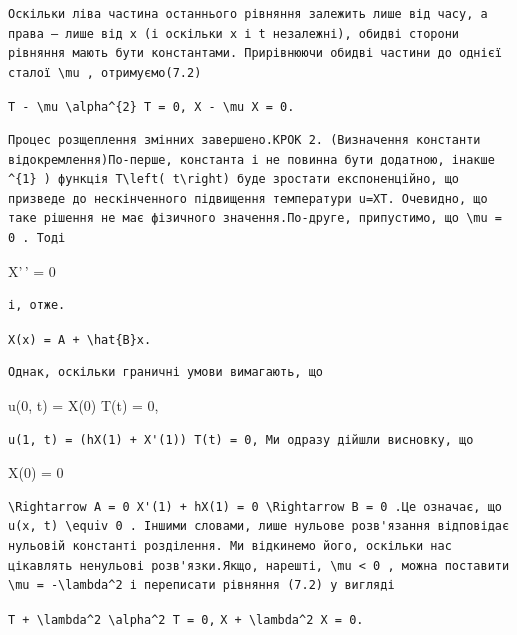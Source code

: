 \documentclass[
  ukrainian,
]{article}
\begin{document}
\begin{verbatim}
Оскільки ліва частина останнього рівняння залежить лише від часу, а права — лише від x (і оскільки x і t незалежні), обидві сторони рівняння мають бути константами. Прирівнюючи обидві частини до однієї сталої \mu , отримуємо(7.2)
\end{verbatim}

\texttt{T\textquotesingle{}\ -\ \textbackslash{}mu\ \textbackslash{}alpha\^{}\{2\}\ T\ =\ 0,\ X\textquotesingle{}\textquotesingle{}\ -\ \textbackslash{}mu\ X\ =\ 0.}

\begin{verbatim}
Процес розщеплення змінних завершено.КРОК 2. (Визначення константи відокремлення)По-перше, константа і не повинна бути додатною, інакше ^{1} ) функція T\left( t\right) буде зростати експоненційно, що призведе до нескінченного підвищення температури u=XT. Очевидно, що таке рішення не має фізичного значення.По-друге, припустимо, що \mu = 0 . Тоді
\end{verbatim}

X'\,' = 0

\begin{verbatim}
і, отже.
\end{verbatim}

\texttt{X(x)\ =\ A\ +\ \textbackslash{}hat\{B\}x.}

\begin{verbatim}
Однак, оскільки граничні умови вимагають, що
\end{verbatim}

u(0, t) = X(0) T(t) = 0,

\begin{verbatim}
u(1, t) = (hX(1) + X'(1)) T(t) = 0, Ми одразу дійшли висновку, що
\end{verbatim}

X(0) = 0

\begin{verbatim}
\Rightarrow A = 0 X'(1) + hX(1) = 0 \Rightarrow B = 0 .Це означає, що u(x, t) \equiv 0 . Іншими словами, лише нульове розв'язання відповідає нульовій константі розділення. Ми відкинемо його, оскільки нас цікавлять ненульові розв'язки.Якщо, нарешті, \mu < 0 , можна поставити \mu = -\lambda^2 і переписати рівняння (7.2) у вигляді
\end{verbatim}

\texttt{T\textquotesingle{}\ +\ \textbackslash{}lambda\^{}2\ \textbackslash{}alpha\^{}2\ T\ =\ 0,}
\texttt{X\textquotesingle{}\ +\ \textbackslash{}lambda\^{}2\ X\ =\ 0.}
\end{document}
